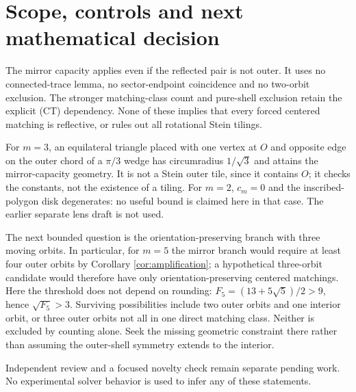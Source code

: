 \documentclass[11pt]{article}
\begin{document}
\section{Scope, controls and next mathematical decision}

The mirror capacity applies even if the reflected pair is not outer. It uses
no connected-trace lemma, no sector-endpoint coincidence and no two-orbit
exclusion. The stronger matching-class count and pure-shell exclusion retain
the explicit (CT) dependency. None of these implies that every forced centered
matching is reflective, or rules out all rotational Stein tilings.

For $m=3$, an equilateral triangle placed with one vertex at $O$ and opposite
edge on the outer chord of a $\pi/3$ wedge has circumradius $1/\sqrt3$ and
attains the mirror-capacity geometry. It is not a Stein outer tile, since it
contains $O$; it checks the constants, not the existence of a tiling. For
$m=2$, $c_m=0$ and the inscribed-polygon disk degenerates: no useful bound is
claimed here in that case. The earlier separate lens draft is not used.

The next bounded question is the orientation-preserving branch with three
moving orbits. In particular, for $m=5$ the mirror branch would require at
least four outer orbits by Corollary \ref{cor:amplification}; a hypothetical
three-orbit candidate would therefore have only orientation-preserving
centered matchings. Here the threshold does not depend on rounding:
$F_5=(13+5\sqrt5)/2>9$, hence $\sqrt{F_5}>3$.
Surviving possibilities include two outer orbits and one
interior orbit, or three outer orbits not all in one direct matching class.
Neither is excluded by counting alone. Seek the missing geometric constraint
there rather than assuming the outer-shell symmetry extends to the interior.

Independent review and a focused novelty check remain separate pending work.
No experimental solver behavior is used to infer any of these statements.
\end{document}
